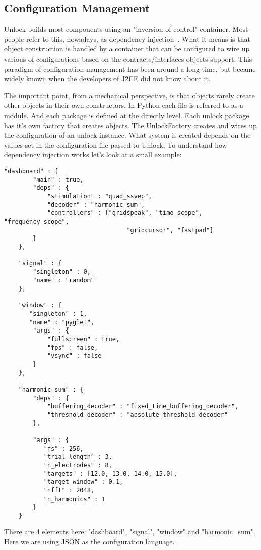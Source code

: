\documentclass[11pt]{article}
\begin{document}
\subsection{Configuration Management}
 Unlock builds most components using an "inversion of control" container.  Most people refer to this, nowadays, as dependency injection~\cite{depinjection}.  What it means is that object construction is handled by a container that can be configured to wire up various of configurations based on the contracts/interfaces objects support.  This paradigm of configuration management has been around a long time, but became widely known when the developers of J2EE did not know about it.

The important point, from a mechanical perspective, is that objects rarely create other objects in their own constructors.  In Python each file is referred to as a module.  And each package is defined at the directly level.  Each unlock package has it's own factory that creates objects.  The UnlockFactory creates and wires up the configuration of an unlock instance.  What system is created depends on the values set in the configuration file passed to Unlock.  To understand how dependency injection works let's look at a small example:
\begin{verbatim}
"dashboard" : {
        "main" : true,
        "deps" : {
            "stimulation" : "quad_ssvep",
            "decoder" : "harmonic_sum",
            "controllers" : ["gridspeak", "time_scope", "frequency_scope",
                                  "gridcursor", "fastpad"]
        }
    },
    
    "signal" : {
        "singleton" : 0,
        "name" : "random"
    },

    "window" : {
       "singleton" : 1,
       "name" : "pyglet",
        "args" : {
            "fullscreen" : true,
            "fps" : false,
            "vsync" : false
        }
    },
   
    "harmonic_sum" : {
        "deps" : {
            "buffering_decoder" : "fixed_time_buffering_decoder",
            "threshold_decoder" : "absolute_threshold_decoder"
        },
        
        "args" : {
           "fs" : 256,
           "trial_length" : 3,
           "n_electrodes" : 8,
           "targets" : [12.0, 13.0, 14.0, 15.0],
           "target_window" : 0.1,
           "nfft" : 2048,
           "n_harmonics" : 1
        }
    }
\end{verbatim}

There are 4 elements here: "dashboard",  "signal", "window" and "harmonic\_sum".  Here we are using JSON as the configuration language. 
\end{document}

